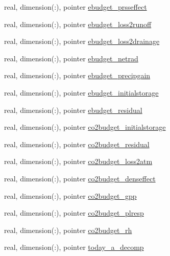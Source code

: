 \begin{DoxyCompactItemize}
real, dimension(\+:), pointer \hyperlink{structed__state__vars_1_1sitetype_a171effaca417e09cc4bc40fa8a88d11d}{ebudget\+\_\+prsseffect}
\item 
real, dimension(\+:), pointer \hyperlink{structed__state__vars_1_1sitetype_a4cce3cac26022f5525c7ea25a80b7b7d}{ebudget\+\_\+loss2runoff}
\item 
real, dimension(\+:), pointer \hyperlink{structed__state__vars_1_1sitetype_af10fe5027f76199d46435da48aa7a880}{ebudget\+\_\+loss2drainage}
\item 
real, dimension(\+:), pointer \hyperlink{structed__state__vars_1_1sitetype_a6b85882ee375531624138b7b1f201467}{ebudget\+\_\+netrad}
\item 
real, dimension(\+:), pointer \hyperlink{structed__state__vars_1_1sitetype_a80a2c6e93cfd00c359e0b7fac2b3c358}{ebudget\+\_\+precipgain}
\item 
real, dimension(\+:), pointer \hyperlink{structed__state__vars_1_1sitetype_a39c65c6c5d2ea1e754a6541c273b66f9}{ebudget\+\_\+initialstorage}
\item 
real, dimension(\+:), pointer \hyperlink{structed__state__vars_1_1sitetype_a6c58dfc1861ecb47326571183ff5af16}{ebudget\+\_\+residual}
\item 
real, dimension(\+:), pointer \hyperlink{structed__state__vars_1_1sitetype_aa1767565cab2685163b633ba1eb42f5e}{co2budget\+\_\+initialstorage}
\item 
real, dimension(\+:), pointer \hyperlink{structed__state__vars_1_1sitetype_a7d8b202aecfa3c1a50c784752b9171ed}{co2budget\+\_\+residual}
\item 
real, dimension(\+:), pointer \hyperlink{structed__state__vars_1_1sitetype_a756f3905f0d2738266bfd120943c6c52}{co2budget\+\_\+loss2atm}
\item 
real, dimension(\+:), pointer \hyperlink{structed__state__vars_1_1sitetype_ad7ba5f91ebefc3e1823d4cf39749fbd1}{co2budget\+\_\+denseffect}
\item 
real, dimension(\+:), pointer \hyperlink{structed__state__vars_1_1sitetype_ab132ec0f73d94b30201a50ad13136bba}{co2budget\+\_\+gpp}
\item 
real, dimension(\+:), pointer \hyperlink{structed__state__vars_1_1sitetype_a6518b0a863a843f732706b791156bdae}{co2budget\+\_\+plresp}
\item 
real, dimension(\+:), pointer \hyperlink{structed__state__vars_1_1sitetype_a80da69db3d80f5faeda99dd78dfd15d0}{co2budget\+\_\+rh}
\item 
real, dimension(\+:), pointer \hyperlink{structed__state__vars_1_1sitetype_ab7df43a2fdea7cccaa811a8832c3a219}{today\+\_\+a\+\_\+decomp}

\end{DoxyCompactItemize}
